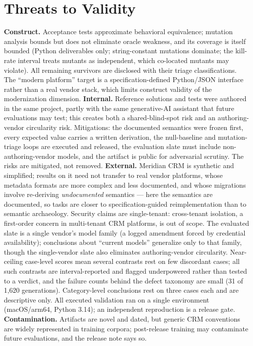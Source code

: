 \documentclass[journal]{IEEEtran}
\begin{document}
\section{Threats to Validity}
\label{sec:threats}
\textbf{Construct.} Acceptance tests approximate behavioral equivalence; mutation analysis
bounds but does not eliminate oracle weakness, and its coverage is itself bounded (Python
deliverables only; string-constant mutations dominate; the kill-rate interval treats mutants
as independent, which co-located mutants may violate). All remaining survivors are disclosed with their triage classifications. The
``modern platform'' target is a specification-defined Python/JSON interface rather than a
real vendor stack, which limits construct validity of the modernization dimension.
\textbf{Internal.} Reference solutions and tests were authored in the same project, partly
with the same generative-AI assistant that future evaluations may test; this creates both a
shared-blind-spot risk and an authoring-vendor circularity risk. Mitigations: the documented
semantics were frozen first, every expected value carries a written derivation, the
null-baseline and mutation-triage loops are executed and released, the evaluation slate must
include non-authoring-vendor models, and the artifact is public for adversarial scrutiny.
The risks are mitigated, not removed. \textbf{External.} Meridian CRM is synthetic and
simplified; results on it need not transfer to real vendor platforms, whose metadata formats
are more complex and less documented, and whose migrations involve re-deriving
\emph{undocumented} semantics --- here the semantics are documented, so tasks are closer to
specification-guided reimplementation than to semantic archaeology. Security claims are
single-tenant: cross-tenant isolation, a first-order concern in multi-tenant CRM platforms,
is out of scope. The evaluated slate is a single vendor's model family (a logged amendment
forced by credential availability); conclusions about ``current models'' generalize only to
that family, though the single-vendor slate also eliminates authoring-vendor circularity.
Near-ceiling case-level scores mean several contrasts rest on few discordant cases; all such
contrasts are interval-reported and flagged underpowered rather than tested to a verdict,
and the failure counts behind the defect taxonomy are small (31 of 1{,}620 generations).
Category-level conclusions rest on three cases each and are descriptive only. All executed
validation ran on a single environment (macOS/arm64, Python 3.14); an independent
reproduction is a release gate. \textbf{Contamination.} Artifacts are novel and
dated, but generic CRM conventions are widely represented in training corpora; post-release
training may contaminate future evaluations, and the release note says so.
\end{document}
